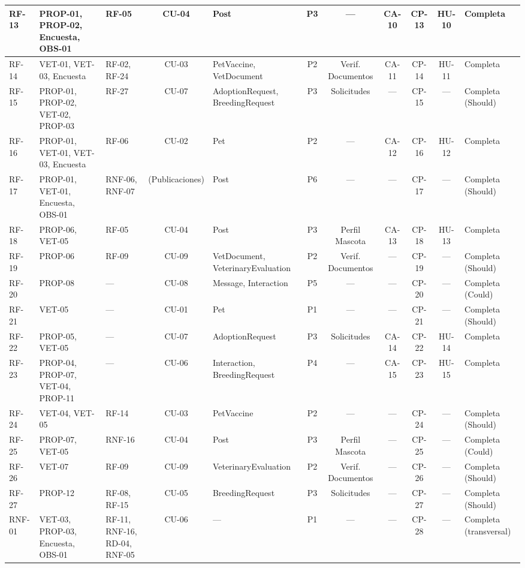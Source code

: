 \documentclass[journal,onecolumn]{IEEEtran}
\begin{document}
\begin{landscape}
\begin{table}[H]
\begin{tabularx}{\linewidth}{|l|X|X|c|X|c|c|c|c|c|X|}
			RF-13 & PROP-01, PROP-02, Encuesta, OBS-01 & RF-05 & CU-04 & Post & P3 & --- & CA-10 & CP-13 & HU-10 & Completa \\ \hline
			RF-14 & VET-01, VET-03, Encuesta & RF-02, RF-24 & CU-03 & PetVaccine, VetDocument & P2 & Verif. Documentos & CA-11 & CP-14 & HU-11 & Completa \\ \hline
			RF-15 & PROP-01, PROP-02, VET-02, PROP-03 & RF-27 & CU-07 & AdoptionRequest, BreedingRequest & P3 & Solicitudes & --- & CP-15 & --- & Completa (Should) \\ \hline
			RF-16 & PROP-01, VET-01, VET-03, Encuesta & RF-06 & CU-02 & Pet & P2 & --- & CA-12 & CP-16 & HU-12 & Completa \\ \hline
			RF-17 & PROP-01, VET-01, Encuesta, OBS-01 & RNF-06, RNF-07 & (Publicaciones) & Post & P6 & --- & --- & CP-17 & --- & Completa (Should) \\ \hline
			RF-18 & PROP-06, VET-05 & RF-05 & CU-04 & Post & P3 & Perfil Mascota & CA-13 & CP-18 & HU-13 & Completa \\ \hline
			RF-19 & PROP-06 & RF-09 & CU-09 & VetDocument, VeterinaryEvaluation & P2 & Verif. Documentos & --- & CP-19 & --- & Completa (Should) \\ \hline
			RF-20 & PROP-08 & --- & CU-08 & Message, Interaction & P5 & --- & --- & CP-20 & --- & Completa (Could) \\ \hline
			RF-21 & VET-05 & --- & CU-01 & Pet & P1 & --- & --- & CP-21 & --- & Completa (Should) \\ \hline
			RF-22 & PROP-05, VET-05 & --- & CU-07 & AdoptionRequest & P3 & Solicitudes & CA-14 & CP-22 & HU-14 & Completa \\ \hline
			RF-23 & PROP-04, PROP-07, VET-04, PROP-11 & --- & CU-06 & Interaction, BreedingRequest & P4 & --- & CA-15 & CP-23 & HU-15 & Completa \\ \hline
			RF-24 & VET-04, VET-05 & RF-14 & CU-03 & PetVaccine & P2 & --- & --- & CP-24 & --- & Completa (Should) \\ \hline
			RF-25 & PROP-07, VET-05 & RNF-16 & CU-04 & Post & P3 & Perfil Mascota & --- & CP-25 & --- & Completa (Could) \\ \hline
			RF-26 & VET-07 & RF-09 & CU-09 & VeterinaryEvaluation & P2 & Verif. Documentos & --- & CP-26 & --- & Completa (Should) \\ \hline
			RF-27 & PROP-12 & RF-08, RF-15 & CU-05 & BreedingRequest & P3 & Solicitudes & --- & CP-27 & --- & Completa (Should) \\ \hline
			RNF-01 & VET-03, PROP-03, Encuesta, OBS-01 & RF-11, RNF-16, RD-04, RNF-05 & CU-06 & --- & P1 & --- & --- & CP-28 & --- & Completa (transversal) \\ \hline

\end{tabularx}
\end{table}
\end{landscape}
\end{document}
